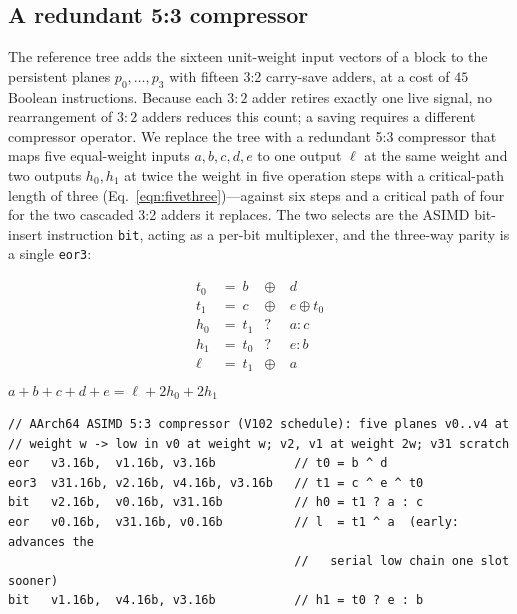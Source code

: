 \documentclass[fleqn,10pt]{wlscirep}
\begin{document}
\subsection*{A redundant 5:3 compressor}
The reference tree adds the sixteen unit-weight input vectors of a block to the persistent planes $p_0,\dots,p_3$ with fifteen 3:2 carry-save adders, at a cost of $45$ Boolean instructions. Because each $3{:}2$ adder retires exactly one live signal, no rearrangement of $3{:}2$ adders reduces this count; a saving requires a different compressor operator. We replace the tree with a redundant 5:3 compressor that maps five equal-weight inputs $a,b,c,d,e$ to one output $\ell$ at the same weight and two outputs $h_0,h_1$ at twice the weight in five operation steps with a critical-path length of three (Eq.~\ref{eqn:fivethree})---against six steps and a critical path of four for the two cascaded 3:2 adders it replaces. The two selects are the ASIMD bit-insert instruction \texttt{bit}, acting as a per-bit multiplexer, and the three-way parity is a single \texttt{eor3}:

\noindent
\begin{minipage}{.26\textwidth}
\begin{equation}\label{eqn:fivethree}
\begin{alignedat}{3}
t_0&=~b &\oplus &~d\\[-1mm]
t_1&=~c &\oplus &~e\oplus t_0\\[-1mm]
h_0&=~t_1 &\mathbin? &~a\mathbin:c\\[-1mm]
h_1&=~t_0 &\mathbin? &~e\mathbin:b\\[-1mm]
\ell&=~t_1 &\oplus &~a\\
\end{alignedat}
\end{equation}
\centering
$a{+}b{+}c{+}d{+}e=\ell+2h_0+2h_1$
\end{minipage}
\hfill
\begin{minipage}{.70\textwidth}\vspace*{4pt}
\begin{lstlisting}[style=customc,language={[Motorola68k]Assembler},morecomment={[l]{//}},morekeywords={eor,eor3,bit}]
// AArch64 ASIMD 5:3 compressor (V102 schedule): five planes v0..v4 at
// weight w -> low in v0 at weight w; v2, v1 at weight 2w; v31 scratch
eor   v3.16b,  v1.16b, v3.16b           // t0 = b ^ d
eor3  v31.16b, v2.16b, v4.16b, v3.16b   // t1 = c ^ e ^ t0
bit   v2.16b,  v0.16b, v31.16b          // h0 = t1 ? a : c
eor   v0.16b,  v31.16b, v0.16b          // l  = t1 ^ a  (early: advances the
                                        //   serial low chain one slot sooner)
bit   v1.16b,  v4.16b, v3.16b           // h1 = t0 ? e : b
\end{lstlisting}
\end{minipage}
\end{document}
